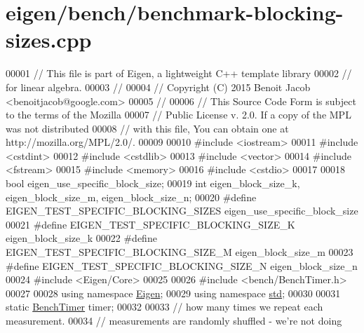 \hypertarget{eigen_2bench_2benchmark-blocking-sizes_8cpp_source}{}\section{eigen/bench/benchmark-\/blocking-\/sizes.cpp}
\label{eigen_2bench_2benchmark-blocking-sizes_8cpp_source}

\begin{DoxyCode}
00001 \textcolor{comment}{// This file is part of Eigen, a lightweight C++ template library}
00002 \textcolor{comment}{// for linear algebra.}
00003 \textcolor{comment}{//}
00004 \textcolor{comment}{// Copyright (C) 2015 Benoit Jacob <benoitjacob@google.com>}
00005 \textcolor{comment}{//}
00006 \textcolor{comment}{// This Source Code Form is subject to the terms of the Mozilla}
00007 \textcolor{comment}{// Public License v. 2.0. If a copy of the MPL was not distributed}
00008 \textcolor{comment}{// with this file, You can obtain one at http://mozilla.org/MPL/2.0/.}
00009 
00010 \textcolor{preprocessor}{#include <iostream>}
00011 \textcolor{preprocessor}{#include <cstdint>}
00012 \textcolor{preprocessor}{#include <cstdlib>}
00013 \textcolor{preprocessor}{#include <vector>}
00014 \textcolor{preprocessor}{#include <fstream>}
00015 \textcolor{preprocessor}{#include <memory>}
00016 \textcolor{preprocessor}{#include <cstdio>}
00017 
00018 \textcolor{keywordtype}{bool} eigen\_use\_specific\_block\_size;
00019 \textcolor{keywordtype}{int} eigen\_block\_size\_k, eigen\_block\_size\_m, eigen\_block\_size\_n;
00020 \textcolor{preprocessor}{#define EIGEN\_TEST\_SPECIFIC\_BLOCKING\_SIZES eigen\_use\_specific\_block\_size}
00021 \textcolor{preprocessor}{#define EIGEN\_TEST\_SPECIFIC\_BLOCKING\_SIZE\_K eigen\_block\_size\_k}
00022 \textcolor{preprocessor}{#define EIGEN\_TEST\_SPECIFIC\_BLOCKING\_SIZE\_M eigen\_block\_size\_m}
00023 \textcolor{preprocessor}{#define EIGEN\_TEST\_SPECIFIC\_BLOCKING\_SIZE\_N eigen\_block\_size\_n}
00024 \textcolor{preprocessor}{#include <Eigen/Core>}
00025 
00026 \textcolor{preprocessor}{#include <bench/BenchTimer.h>}
00027 
00028 \textcolor{keyword}{using namespace }\hyperlink{namespace_eigen}{Eigen};
00029 \textcolor{keyword}{using namespace }\hyperlink{namespacestd}{std};
00030 
00031 \textcolor{keyword}{static} \hyperlink{class_eigen_1_1_bench_timer}{BenchTimer} timer;
00032 
00033 \textcolor{comment}{// how many times we repeat each measurement.}
00034 \textcolor{comment}{// measurements are randomly shuffled - we're not doing}

\end{DoxyCode}
